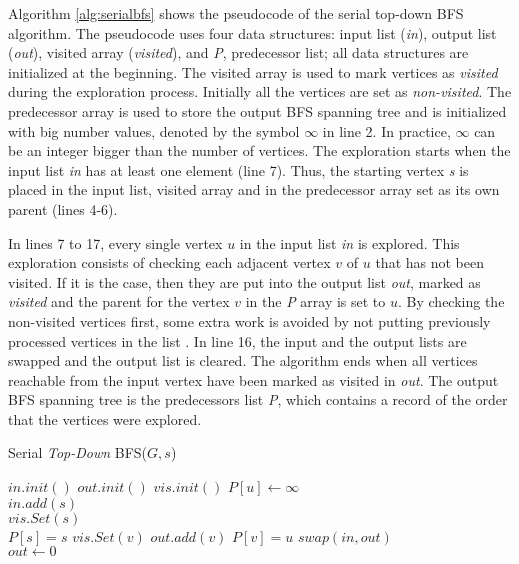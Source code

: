 \documentclass{sig-alternate-05-2015}
\begin{document}
Algorithm \ref{alg:serialbfs} shows the pseudocode of the serial
top-down BFS algorithm. The pseudocode uses four data structures:
input list (\textit{in}), output list (\textit{out}), visited array
(\textit{visited}), and \textit{P}, predecessor list; all data
structures are initialized at the beginning. The visited array is used
to mark vertices as \textit{visited} during the exploration
process. Initially all the vertices are set as
\textit{non-visited}. The predecessor array is used to store the
output BFS spanning tree and is initialized with big number values,
denoted by the symbol $\infty$ in line 2. In practice, $\infty$ can be
an integer bigger than the number of vertices. The exploration starts
when the input list \textit{in} has at least one element (line
7). Thus, the starting vertex \textit{s} is placed in the input list,
visited array and in the predecessor array set as its own parent
(lines 4-6).
 
 In lines 7 to 17, every single vertex $u$ in the input list
 \textit{in} is explored. This exploration consists of checking each
 adjacent vertex $v$ of $u$ that has not been visited. If it is the
 case, then they are put into the output list \textit{out}, marked as
 \textit{visited} and the parent for the vertex $v$ in the \textit{P}
 array is set to $u$. By checking the non-visited vertices first, some
 extra work is avoided by not putting previously processed vertices in
 the list \cite{Agarwal}. In line 16, the input and the output lists
 are swapped and the output list is cleared. The algorithm ends when
 all vertices reachable from the input vertex have been marked as
 visited in \textit{out}. The output BFS spanning tree is the
 predecessors list \textit{P}, which contains a record of the order
 that the vertices were explored.
 




\begin{algorithm}[H]
\small
\caption{Serial \textit{Top-Down} BFS($G, s$) }
\label{alg:serialbfs}
\begin{algorithmic}[1]

\renewcommand{\algorithmicrequire}{\textbf{Initialize:}}
\REQUIRE $in.init()$
 $out.init()$
 $vis.init()$
\STATE 
$P[u] \leftarrow  \infty$ \\
\ENDFOR
\STATE
$in.add(s)$ \\
\STATE
$vis.Set(s)$ \\
\STATE
$P[s] = s$
\STATE $vis.Set(v)$
\STATE $out.add(v)$
\STATE $P[v] = u $
\ENDIF
\ENDFOR
\ENDFOR
\STATE $swap(in, out)$\\
 $out \leftarrow 0$
\ENDWHILE

\end{algorithmic}
\end{algorithm}
\end{document}
